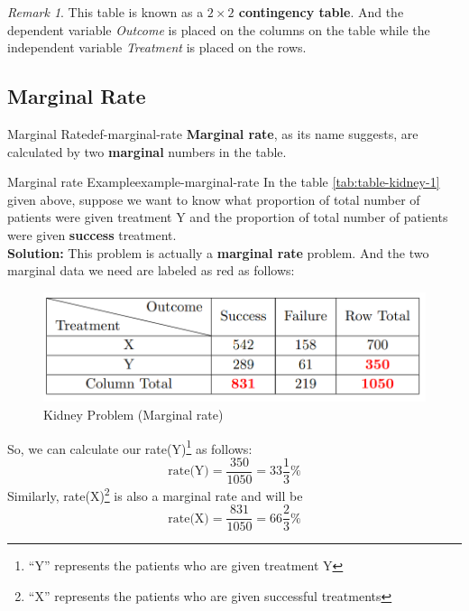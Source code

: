\documentclass[math,code]{amznotes}
\theoremstyle{remark}
\newtheorem*{remark}{Remark}
\begin{document}
\begin{notebox}
    \begin{remark}
        This table is known as a \textbf{$2\times 2$ contingency table}. And the dependent variable \textit{Outcome} is placed on the columns on the table while the independent variable \textit{Treatment} is placed on the rows.
        
    \end{remark}
\end{notebox}

\subsection{Marginal Rate}
\begin{dfnbox}{Marginal Rate}{def-marginal-rate}
    {\color{red} \textbf{Marginal rate}}, as its name suggests, are calculated by two \textbf{marginal} numbers in the table.
\end{dfnbox}
\begin{exbox}{Marginal rate Example}{example-marginal-rate}
    In the table \ref{tab:table-kidney-1} given above, suppose we want to know what proportion of total number of patients were given treatment Y and the proportion of total number of patients were given \textbf{success} treatment. \\
    \textbf{Solution:} This problem is actually a \textbf{marginal rate} problem. And the two marginal data we need are labeled as red as follows:
    \begin{figure}[H]
        \centering
        \includegraphics[width=0.75\linewidth]{images/chapter2-marginal-rate.png}
        \caption{Kidney Problem (Marginal rate)}
        \label{fig:table-kidney-2}
    \end{figure}
    So, we can calculate our rate(Y)\footnote{``Y'' represents the patients who are given treatment Y} as follows:
    \begin{displaymath}
        \text{rate(Y)}=\frac{350}{1050}=33\frac{1}{3}\%
    \end{displaymath}
    Similarly, rate(X)\footnote{``X'' represents the patients who are given successful treatments} is also a marginal rate and will be
    \begin{displaymath}
        \text{rate(X)}=\frac{831}{1050}=66\frac{2}{3}\%
    \end{displaymath}
\end{exbox}
\end{document}
